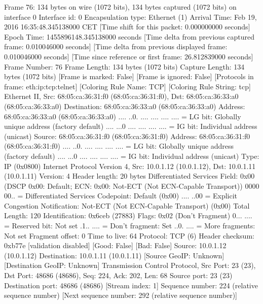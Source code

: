 Frame 76: 134 bytes on wire (1072 bits), 134 bytes captured (1072 bits) on interface 0
    Interface id: 0
    Encapsulation type: Ethernet (1)
    Arrival Time: Feb 19, 2016 16:35:48.345138000 CET
    [Time shift for this packet: 0.000000000 seconds]
    Epoch Time: 1455896148.345138000 seconds
    [Time delta from previous captured frame: 0.010046000 seconds]
    [Time delta from previous displayed frame: 0.010046000 seconds]
    [Time since reference or first frame: 26.812839000 seconds]
    Frame Number: 76
    Frame Length: 134 bytes (1072 bits)
    Capture Length: 134 bytes (1072 bits)
    [Frame is marked: False]
    [Frame is ignored: False]
    [Protocols in frame: eth:ip:tcp:telnet]
    [Coloring Rule Name: TCP]
    [Coloring Rule String: tcp]
Ethernet II, Src: 68:05:ca:36:31:f0 (68:05:ca:36:31:f0), Dst: 68:05:ca:36:33:a0 (68:05:ca:36:33:a0)
    Destination: 68:05:ca:36:33:a0 (68:05:ca:36:33:a0)
        Address: 68:05:ca:36:33:a0 (68:05:ca:36:33:a0)
        .... ..0. .... .... .... .... = LG bit: Globally unique address (factory default)
        .... ...0 .... .... .... .... = IG bit: Individual address (unicast)
    Source: 68:05:ca:36:31:f0 (68:05:ca:36:31:f0)
        Address: 68:05:ca:36:31:f0 (68:05:ca:36:31:f0)
        .... ..0. .... .... .... .... = LG bit: Globally unique address (factory default)
        .... ...0 .... .... .... .... = IG bit: Individual address (unicast)
    Type: IP (0x0800)
Internet Protocol Version 4, Src: 10.0.1.12 (10.0.1.12), Dst: 10.0.1.11 (10.0.1.11)
    Version: 4
    Header length: 20 bytes
    Differentiated Services Field: 0x00 (DSCP 0x00: Default; ECN: 0x00: Not-ECT (Not ECN-Capable Transport))
        0000 00.. = Differentiated Services Codepoint: Default (0x00)
        .... ..00 = Explicit Congestion Notification: Not-ECT (Not ECN-Capable Transport) (0x00)
    Total Length: 120
    Identification: 0x6ceb (27883)
    Flags: 0x02 (Don't Fragment)
        0... .... = Reserved bit: Not set
        .1.. .... = Don't fragment: Set
        ..0. .... = More fragments: Not set
    Fragment offset: 0
    Time to live: 64
    Protocol: TCP (6)
    Header checksum: 0xb77e [validation disabled]
        [Good: False]
        [Bad: False]
    Source: 10.0.1.12 (10.0.1.12)
    Destination: 10.0.1.11 (10.0.1.11)
    [Source GeoIP: Unknown]
    [Destination GeoIP: Unknown]
Transmission Control Protocol, Src Port: 23 (23), Dst Port: 48686 (48686), Seq: 224, Ack: 202, Len: 68
    Source port: 23 (23)
    Destination port: 48686 (48686)
    [Stream index: 1]
    Sequence number: 224    (relative sequence number)
    [Next sequence number: 292    (relative sequence number)]
